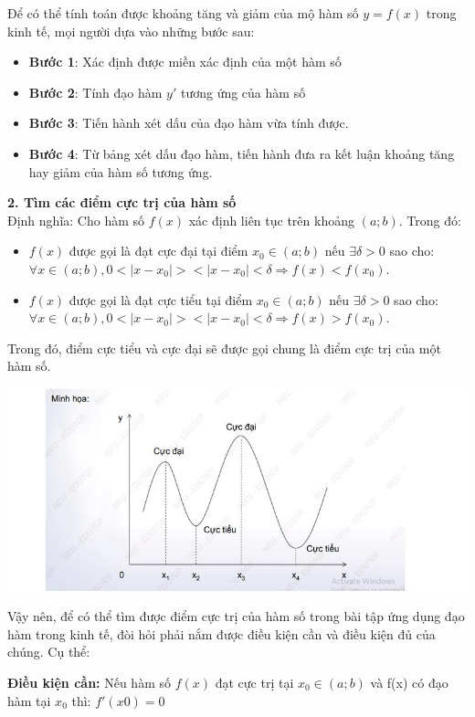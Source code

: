 \documentclass[12pt,a4paper]{report}
\begin{document}
Để có thể tính toán được khoảng tăng và giảm của mộ hàm số $y = f(x)$ trong kinh tế, mọi người dựa vào những bước sau:
\begin{itemize}
    \item \textbf{Bước 1}: Xác định được miền xác định của một hàm số
    \item \textbf{Bước 2}: Tính đạo hàm $y'$ tương ứng của hàm số
    \item \textbf{Bước 3}: Tiến hành xét dấu của đạo hàm vừa tính được.
    \item \textbf{Bước 4}: Từ bảng xét dấu đạo hàm, tiến hành đưa ra kết luận khoảng tăng hay giảm của hàm số tương ứng.
\end{itemize}

\textbf{2. Tìm các điểm cực trị của hàm số}\\
Định nghĩa: Cho hàm số $f(x)$ xác định liên tục trên khoảng $(a;b)$. Trong đó:
\begin{itemize}
    \item $f(x)$ được gọi là đạt cực đại tại điểm $x_0 \in (a;b)$ nếu $\exists \delta > 0$ sao cho: $\forall x \in (a;b), 0 < | x - x_0| >< |x - x_0| < \delta \Rightarrow f(x) < f(x_0)$.
    \item $f(x)$ được gọi là đạt cực tiểu tại điểm $x_0 \in (a;b)$ nếu $\exists \delta > 0$ sao cho: $\forall x \in (a;b), 0 < | x - x_0| >< |x - x_0| < \delta \Rightarrow f(x) > f(x_0)$.
\end{itemize}
Trong đó, điểm cực tiểu và cực đại sẽ được gọi chung là điểm cực trị của một hàm số.
\begin{center}
    \includegraphics[scale = 0.65]{3.png}
\end{center}

Vậy nên, để có thể tìm được điểm cực trị của hàm số trong bài tập ứng dụng đạo hàm trong kinh tế, đòi hỏi phải nắm được điều kiện cần và điều kiện đủ của chúng. Cụ thể:

\textbf{Điều kiện cần:} Nếu hàm số $f(x)$ đạt cực trị tại $x_0 \in (a;b)$ và f(x) có đạo hàm tại $x_0$ thì: $f'(x0) = 0$
\end{document}
